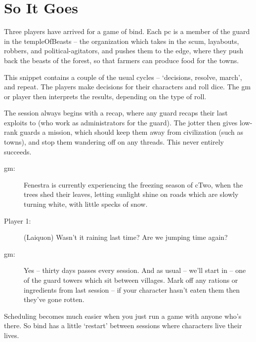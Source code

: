 \section[Example of Play]{So It Goes}

\begin{multicols}{3}

\noindent
Three players have arrived for a game of \gls{bind}.
Each \gls{pc} is a member of the \gls{guard} in the \gls{templeOfBeasts} -- the organization which takes in the scum, layabouts, robbers, and political-agitators, and pushes them to the \gls{edge}, where they push back the beasts of the forest, so that farmers can produce food for the towns.

This snippet contains a couple of the usual cycles -- `decisions, resolve, march', and repeat.
The players make decisions for their characters and roll dice.
The \gls{gm} or player then interprets the results, depending on the type of roll.

The session always begins with a recap, where any \gls{guard} recaps their last exploits to  (who work as administrators for the \gls{guard}).
The \gls{jotter} then gives low-rank \glspl{guard} a mission, which should keep them away from civilization (such as towns), and stop them wandering off on any \glspl{thread}.
This never entirely succeeds.

\begin{description}
  \item[\gls{gm}:]
  Fenestra is currently experiencing the freezing season of \gls{cTwo}, when the trees shed their leaves, letting sunlight shine on roads which are slowly turning white, with little specks of snow.

  \item[Player 1:]
  (Laiquon)
  Wasn't it raining last time? Are we jumping time again?

  \item[\gls{gm}:]
  Yes -- thirty days passes every session.
  And as usual -- we'll start in  -- one of the \gls{guard} towers which sit between \glspl{village}.
  Mark off any rations or \glspl{ingredient} from last session -- if your character hasn't eaten them then they've gone rotten.
\end{description}

\bigLine
\vspace{\baselineskip}
Scheduling becomes much easier when you just run a game with anyone who's there.
So \gls{bind} has a little `restart' between sessions where characters live their lives.


\end{multicols}
